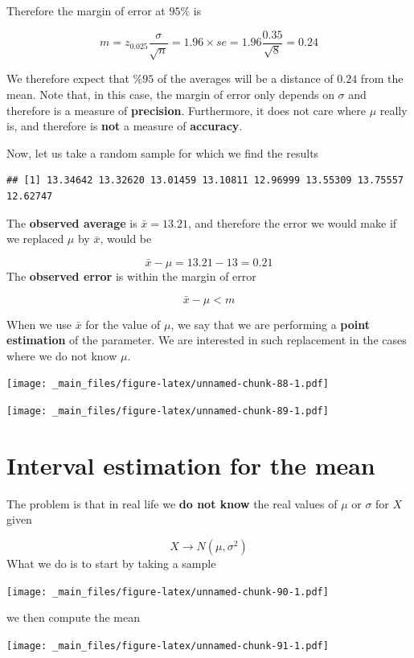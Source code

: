 \documentclass[
]{book}
\begin{document}
Therefore the margin of error at \(95\%\) is

\[m=z_{0.025} \frac{\sigma}{\sqrt{n}}=1.96\times se=1.96\frac{0.35}{\sqrt{8}}=0.24\]

We therefore expect that \(\%95\) of the averages will be a distance of \(0.24\) from the mean. Note that, in this case, the margin of error only depends on \(\sigma\) and therefore is a measure of \textbf{precision}. Furthermore, it does not care where \(\mu\) really is, and therefore is \textbf{not} a measure of \textbf{accuracy}.

Now, let us take a random sample for which we find the results

\begin{verbatim}
## [1] 13.34642 13.32620 13.01459 13.10811 12.96999 13.55309 13.75557 12.62747
\end{verbatim}

The \textbf{observed average} is \(\bar{x}=13.21\), and therefore the error we would make if we replaced \(\mu\) by \(\bar{x}\), would be

\[\bar{x}-\mu=13.21-13=0.21\]
The \textbf{observed error} is within the margin of error

\[\bar{x}-\mu <m\]

When we use \(\bar{x}\) for the value of \(\mu\), we say that we are performing a \textbf{point estimation} of the parameter. We are interested in such replacement in the cases where we do not know \(\mu\).

\texttt{[image: \_main\_files/figure-latex/unnamed-chunk-88-1.pdf]}

\texttt{[image: \_main\_files/figure-latex/unnamed-chunk-89-1.pdf]}

\hypertarget{interval-estimation-for-the-mean}{%
\section{Interval estimation for the mean}\label{interval-estimation-for-the-mean}}

The problem is that in real life we \textbf{do not know} the real values of \(\mu\) or \(\sigma\) for \(X\) given

\[X \rightarrow N(\mu, \sigma^2)\]
What we do is to start by taking a sample

\texttt{[image: \_main\_files/figure-latex/unnamed-chunk-90-1.pdf]}

we then compute the mean

\texttt{[image: \_main\_files/figure-latex/unnamed-chunk-91-1.pdf]}
\end{document}
